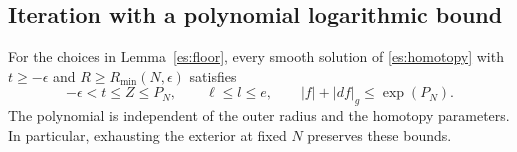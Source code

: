 \subsection{Iteration with a polynomial logarithmic bound}

\begin{proposition}\label{es:distortion}
For the choices in Lemma~\ref{es:floor}, every smooth solution of
\eqref{es:homotopy} with $t\ge-\epsilon$ and
$R\ge R_{\min}(N,\epsilon)$ satisfies
\begin{equation}\label{es:distortion-bound}
 -\epsilon<t\le Z\le P_N,\qquad
 \ell\le l\le e,\qquad
 |f|+|df|_g\le\exp(P_N).
\end{equation}
The polynomial is independent of the outer radius and the homotopy
parameters.  In particular, exhausting the exterior at fixed $N$
preserves these bounds.
\end{proposition}

